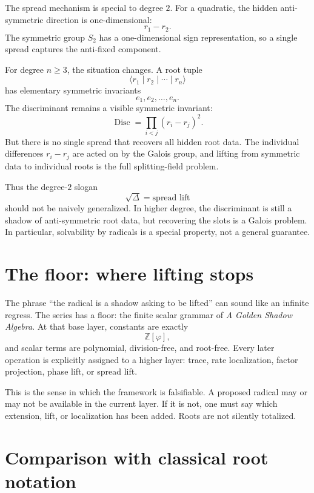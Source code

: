 \documentclass[11pt]{article}
\newcommand{\Disc}{\operatorname{Disc}}
\newcommand{\ph}{\varphi}
\newcommand{\Z}{\mathbb{Z}}
\begin{document}
The spread mechanism is special to degree $2$.  For a quadratic, the hidden anti-symmetric direction is one-dimensional:
\[
    r_1-r_2.
\]
The symmetric group $S_2$ has a one-dimensional sign representation, so a single spread captures the anti-fixed component.

For degree $n\ge3$, the situation changes.  A root tuple
\[
    \langle r_1\mid r_2\mid\cdots\mid r_n\rangle
\]
has elementary symmetric invariants
\[
    e_1,e_2,\dots,e_n.
\]
The discriminant remains a visible symmetric invariant:
\[
    \Disc=\prod_{i<j}(r_i-r_j)^2.
\]
But there is no single spread that recovers all hidden root data.  The individual differences $r_i-r_j$ are acted on by the Galois group, and lifting from symmetric data to individual roots is the full splitting-field problem.

Thus the degree-$2$ slogan
\[
    \sqrt{\Delta}=\text{spread lift}
\]
should not be naively generalized.  In higher degree, the discriminant is still a shadow of anti-symmetric root data, but recovering the slots is a Galois problem.  In particular, solvability by radicals is a special property, not a general guarantee.

\section{The floor: where lifting stops}

The phrase ``the radical is a shadow asking to be lifted'' can sound like an infinite regress.  The series has a floor: the finite scalar grammar of \emph{A Golden Shadow Algebra}.  At that base layer, constants are exactly
\[
    \Z[\ph],
\]
and scalar terms are polynomial, division-free, and root-free.  Every later operation is explicitly assigned to a higher layer: trace, rate localization, factor projection, phase lift, or spread lift.

This is the sense in which the framework is falsifiable.  A proposed radical may or may not be available in the current layer.  If it is not, one must say which extension, lift, or localization has been added.  Roots are not silently totalized.

\section{Comparison with classical root notation}
\end{document}

